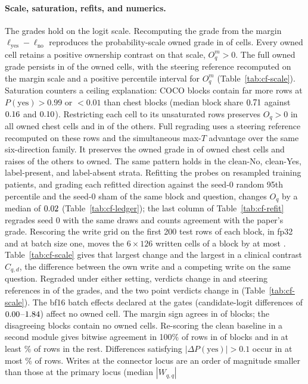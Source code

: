 \documentclass{article}
\begin{document}
\paragraph{Scale, saturation, refits, and numerics.} The grades hold on the logit scale. Recomputing the grade from the margin $\ell_{\mathrm{yes}}-\ell_{\mathrm{no}}$ reproduces the probability-scale owned grade in \cfScaleAgree{} of \cfScaleAgreeN{} cells. Every owned cell retains a positive ownership contrast on that scale, $O^m_q>0$. The full owned grade persists in \cfScaleOwnedKeepFull{} of the \cfScaleOwned{} owned cells, with the steering reference recomputed on the margin scale and a positive percentile interval for $O^m_q$ (Table~\ref{tab:cf-scale}). Saturation counters a ceiling explanation: COCO blocks contain far more rows at $P(\mathrm{yes})>0.99$ or $<0.01$ than chest blocks (median block share $0.71$ against $0.16$ and $0.10$). Restricting each cell to its unsaturated rows preserves $O_q>0$ in all \cfScaleUnsatOwned{} owned chest cells and in \cfScaleUnsatOtherPos{} of the \cfScaleUnsatOther{} others. Full regrading uses a steering reference recomputed on these rows and the simultaneous max-$T$ advantage over the same six-direction family. It preserves the owned grade in \cfScaleUnsatGradeKept{} of \cfScaleUnsatGradeN{} owned chest cells and raises \cfScaleUnsatGradeGained{} of the \cfScaleUnsatGradeOtherN{} others to owned. The same pattern holds in the clean-No, clean-Yes, label-present, and label-absent strata. Refitting the probes on resampled training patients, and grading each refitted direction against the seed-0 random 95th percentile and the seed-0 sham of the same block and question, changes $O_q$ by a median of $0.02$ (Table~\ref{tab:cf-ledger}); the last column of Table~\ref{tab:cf-refit} regrades seed 0 with the same draws and counts agreement with the paper's grade. Rescoring the write grid on the first 200 test rows of each block, in fp32 and at batch size one, moves the $6\times126$ written cells of a block by at most \cfPrecisionMaxDW{}. Table~\ref{tab:cf-scale} gives that largest change and the largest in a clinical contrast $C_{q,d}$, the difference between the own write and a competing write on the same question. Regraded under either setting, verdicts change in \cfPrecisionVerdictChanges{} and steering references in \cfPrecisionRefChanges{} of the \cfPrecisionGradeCells{} grades, and the two point verdicts change in \cfPrecisionPointVerdictChanges{} (Table~\ref{tab:cf-scale}). The bf16 batch effects declared at the gates (candidate-logit differences of $0.00$--$1.84$) affect no owned cell. The margin sign agrees in \cfScaleBatchAgree{} of \cfScaleBatchN{} blocks; the \cfScaleBatchDisagree{} disagreeing blocks contain no owned cells. Re-scoring the clean baseline in a second module gives bitwise agreement in 100\% of rows in \cfScaleBaselineIdentical{} of \cfScaleBaselineN{} blocks and in at least \cfScaleBaselineRestPct\% of rows in the rest. Differences satisfying $|\Delta P(\mathrm{yes})|>0.1$ occur in at most \cfScaleBaselineDpPct\% of rows. Writes at the connector locus are an order of magnitude smaller than those at the primary locus (median $|W_{q,q}|$ 
\end{document}
